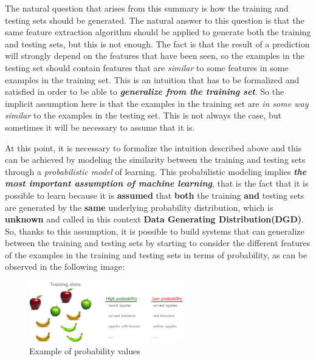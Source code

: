 The natural question that arises from this summary is how the training
and testing sets should be generated. The natural answer to this
question is that the same feature extraction algorithm should be applied
to generate both the training and testing sets, but this is not enough.
The fact is that the result of a prediction will strongly depend on the
features that have been seen, so the examples in the testing set should
contain features that are \emph{similar} to some features in some
examples in the training set. This is an intuition that has to be
formalized and satisfied in order to be able to
\emph{\textbf{generalize from the training set}}. So the implicit
assumption here is that the examples in the training set are
\emph{in some way similar} to the examples in the testing set.
This is not always the case, but sometimes it will be necessary
to assume that it is.

At this point, it is necessary to formalize the intuition described
above and this can be achieved by modeling the similarity between
the training and testing sets through a \emph{probabilistic model}
of learning. This probabilistic modeling implies
\emph{\textbf{the most important assumption of machine learning}},
that is the fact that it is possible to learn because it is
\textbf{assumed} that \textbf{both} the training
\textbf{and} testing sets are generated by the \textbf{same} underlying
probability distribution, which is \textbf{unknown} and called in
this context \textbf{Data Generating Distribution(DGD)}.
So, thanks to this assumption, it is possible to build systems that
can generalize between the training and testing sets by starting to
consider the different features of the examples in the training
and testing sets in terms of probability, as can be observed in the
following image:

\vspace{5mm}

\begin{figure}[h]
      \centering
      \includegraphics[width=0.6\textwidth]{../img/Testing_set_prob}
      \caption{Example of probability values}
\end{figure}

\vspace{5mm}

